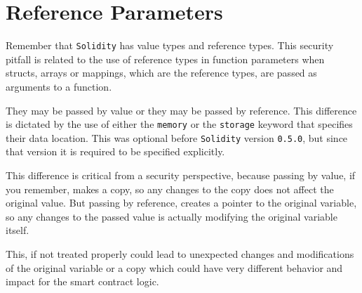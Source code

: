 \section{Reference Parameters}\label{reference-parameters}

Remember that \texttt{Solidity} has value types and reference types.
This security pitfall is related to the use of reference types in
function parameters when structs, arrays or mappings, which are the
reference types, are passed as arguments to a function.

They may be passed by value or they may be passed by reference. This
difference is dictated by the use of either the \texttt{memory} or the
\texttt{storage} keyword that specifies their data location. This was
optional before \texttt{Solidity} version \texttt{0.5.0}, but since that
version it is required to be specified explicitly.

This difference is critical from a security perspective, because passing
by value, if you remember, makes a copy, so any changes to the copy does
not affect the original value. But passing by reference, creates a
pointer to the original variable, so any changes to the passed value is
actually modifying the original variable itself.

This, if not treated properly could lead to unexpected changes and
modifications of the original variable or a copy which could have very
different behavior and impact for the smart contract logic.

